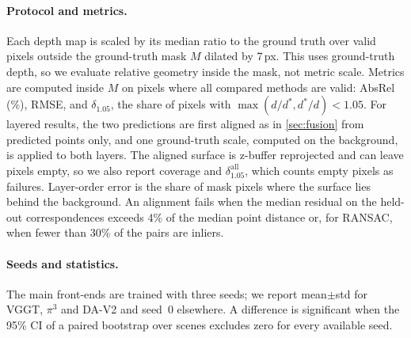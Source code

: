 \paragraph{Protocol and metrics.}
Each depth map is scaled by its median ratio to the ground truth over valid pixels outside the ground-truth mask $M$ dilated by 7\,px.
This uses ground-truth depth, so we evaluate relative geometry inside the mask, not metric scale.
Metrics are computed inside $M$ on pixels where all compared methods are valid: AbsRel (\%), RMSE, and $\delta_{1.05}$, the share of pixels with $\max(d/d^*, d^*/d) < 1.05$.
For layered results, the two predictions are first aligned as in \cref{sec:fusion} from predicted points only, and one ground-truth scale, computed on the background, is applied to both layers.
The aligned surface is z-buffer reprojected and can leave pixels empty, so we also report coverage and $\delta_{1.05}^{\mathrm{all}}$, which counts empty pixels as failures.
Layer-order error is the share of mask pixels where the surface lies behind the background.
An alignment fails when the median residual on the held-out correspondences exceeds 4\% of the median point distance or, for RANSAC, when fewer than 30\% of the pairs are inliers.

\paragraph{Seeds and statistics.}
The main front-ends are trained with three seeds; we report mean$\pm$std for VGGT, $\pi^3$ and DA-V2 and seed~0 elsewhere.
A difference is significant when the 95\% CI of a paired bootstrap over scenes excludes zero for every available seed.

\providecommand{\sd}[1]{{\scriptsize$\pm$#1}}
\newcommand{\tbgray}[1]{\textcolor{gray}{#1}}
\newcommand{\tbgood}[2]{\expheat{ExpGood!#1!ExpMid}{#2}}
\newcommand{\tbpoor}[2]{\expheat{ExpMid!#1!ExpPoor}{#2}}

